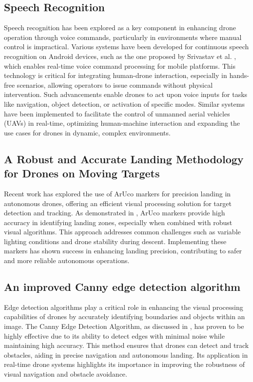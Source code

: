 \documentclass[3p,times]{elsarticle}
\begin{document}
\subsection{Speech Recognition}
Speech recognition has been explored as a key component in enhancing drone operation through voice commands, particularly in environments where manual control is impractical. Various systems have been developed for continuous speech recognition on Android devices, such as the one proposed by Srivastav et al. \cite{SpeechRecognition}, which enables real-time voice command processing for mobile platforms. This technology is critical for integrating human-drone interaction, especially in hands-free scenarios, allowing operators to issue commands without physical intervention. Such advancements enable drones to act upon voice inputs for tasks like navigation, object detection, or activation of specific modes. Similar systems have been implemented to facilitate the control of unmanned aerial vehicles (UAVs) in real-time, optimizing human-machine interaction and expanding the use cases for drones in dynamic, complex environments.

\subsection{A Robust and Accurate Landing Methodology for Drones on Moving Targets}
Recent work has explored the use of ArUco markers for precision landing in autonomous drones, offering an efficient visual processing solution for target detection and tracking. As demonstrated in \cite{drones6040098}, ArUco markers provide high accuracy in identifying landing zones, especially when combined with robust visual algorithms. This approach addresses common challenges such as variable lighting conditions and drone stability during descent. Implementing these markers has shown success in enhancing landing precision, contributing to safer and more reliable autonomous operations.

\subsection{An improved Canny edge detection algorithm}
Edge detection algorithms play a critical role in enhancing the visual processing capabilities of drones by accurately identifying boundaries and objects within an image. The Canny Edge Detection Algorithm, as discussed in \cite{rong2014improved}, has proven to be highly effective due to its ability to detect edges with minimal noise while maintaining high accuracy. This method ensures that drones can detect and track obstacles, aiding in precise navigation and autonomous landing. Its application in real-time drone systems highlights its importance in improving the robustness of visual navigation and obstacle avoidance.
\end{document}
